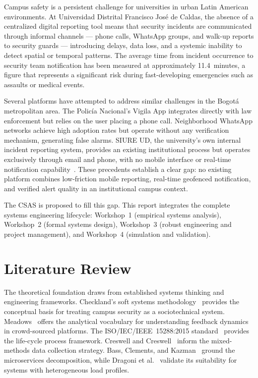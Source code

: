 \documentclass[11pt,a4paper]{article}
\begin{document}
Campus safety is a persistent challenge for universities in urban Latin American environments. At Universidad Distrital Francisco Jos\'e de Caldas, the absence of a centralized digital reporting tool means that security incidents are communicated through informal channels --- phone calls, WhatsApp groups, and walk-up reports to security guards --- introducing delays, data loss, and a systemic inability to detect spatial or temporal patterns. The average time from incident occurrence to security team notification has been measured at approximately 11.4~minutes, a figure that represents a significant risk during fast-developing emergencies such as assaults or medical events.

Several platforms have attempted to address similar challenges in the Bogot\'a metropolitan area. The Polic\'ia Nacional's Vigila App integrates directly with law enforcement but relies on the user placing a phone call. Neighborhood WhatsApp networks achieve high adoption rates but operate without any verification mechanism, generating false alarms. SIURE UD, the university's own internal incident reporting system, provides an existing institutional process but operates exclusively through email and phone, with no mobile interface or real-time notification capability~\cite{sierra2026}. These precedents establish a clear gap: no existing platform combines low-friction mobile reporting, real-time geofenced notification, and verified alert quality in an institutional campus context.

The CSAS is proposed to fill this gap. This report integrates the complete systems engineering lifecycle: Workshop~1 (empirical systems analysis), Workshop~2 (formal systems design), Workshop~3 (robust engineering and project management), and Workshop~4 (simulation and validation).


\section{Literature Review}

The theoretical foundation draws from established systems thinking and engineering frameworks. Checkland's soft systems methodology~\cite{checkland1981} provides the conceptual basis for treating campus security as a sociotechnical system. Meadows~\cite{meadows2008} offers the analytical vocabulary for understanding feedback dynamics in crowd-sourced platforms. The ISO/IEC/IEEE~15288:2015 standard~\cite{iso15288} provides the life-cycle process framework. Creswell and Creswell~\cite{creswell2018} inform the mixed-methods data collection strategy. Bass, Clements, and Kazman~\cite{bass2013} ground the microservices decomposition, while Dragoni et al.~\cite{dragoni2017} validate its suitability for systems with heterogeneous load profiles.
\end{document}
